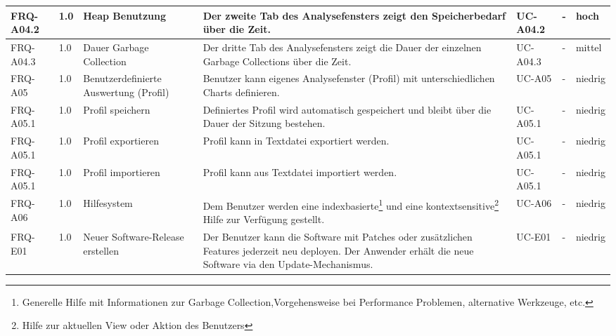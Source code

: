\begin{landscape}
\begin{longtable}{|p{1.8cm}|p{0.7cm}|p{2.5cm}|p{6cm}|p{1.6cm}|p{3cm}|p{0.9cm}|}
   FRQ-A04.2 & 1.0 & Heap Benutzung & Der zweite Tab des Analysefensters zeigt den Speicherbedarf über die Zeit. & UC-A04.2 & - & hoch 
 \\\hline

   FRQ-A04.3 & 1.0 & Dauer Garbage Collection & Der dritte Tab des Analysefensters zeigt die Dauer der einzelnen Garbage Collections über die Zeit. & UC-A04.3 & - & mittel 
 \\\hline

   FRQ-A05 & 1.0 & Benutzerdefinierte Auswertung (Profil) & Benutzer kann eigenes Analysefenster (Profil) mit unterschiedlichen Charts definieren. & UC-A05 & - & niedrig \\\hline

   FRQ-A05.1 & 1.0 & Profil speichern & Definiertes Profil wird automatisch gespeichert und bleibt über die Dauer der Sitzung bestehen. & UC-A05.1 & - & niedrig \\\hline

  FRQ-A05.1 & 1.0 & Profil exportieren & Profil kann in Textdatei exportiert werden. & UC-A05.1 & - & niedrig \\\hline

  FRQ-A05.1 & 1.0 & Profil importieren & Profil kann aus Textdatei importiert werden. & UC-A05.1 & - & niedrig \\\hline

  FRQ-A06 & 1.0 & Hilfesystem &  Dem Benutzer werden eine indexbasierte\footnote{Generelle Hilfe mit Informationen zur Garbage Collection,Vorgehensweise bei Performance Problemen, alternative Werkzeuge, etc.} und eine kontextsensitive\footnote{Hilfe zur aktuellen View oder Aktion des Benutzers} Hilfe zur Verfügung gestellt. & UC-A06 & - & niedrig \\\hline

  FRQ-E01 & 1.0 & Neuer Software-Release erstellen & Der Benutzer kann die Software mit Patches oder zusätzlichen Features jederzeit neu deployen. Der Anwender erhält die neue Software via den Update-Mechanismus.& UC-E01 & - & niedrig \\\hline

\end{longtable}
\end{landscape}

